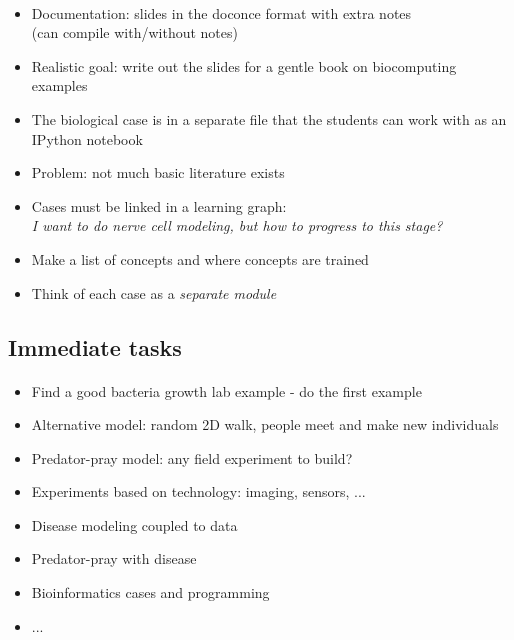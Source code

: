 \documentclass[%
twoside,                 %
final,                   %
10pt]{article}
\begin{document}
\paragraph{}
\begin{itemize}
 \item Documentation: slides in the doconce format with extra notes\\
   (can compile with/without notes)

 \item Realistic goal: write out the slides for a gentle book on biocomputing examples

 \item The biological case is in a separate file that the students can work
   with as an IPython notebook

 \item Problem: not much basic literature exists

 \item Cases must be linked in a learning graph:\\
   \emph{I want to do nerve cell modeling, but how to progress to this stage?}

 \item Make a list of concepts and where concepts are trained

 \item Think of each case as a \emph{separate module}
\end{itemize}

\noindent



\subsection{Immediate tasks}


\paragraph{}
\begin{itemize}
 \item Find a good bacteria growth lab example - do the first example

 \item Alternative model: random 2D walk, people meet and make new individuals

 \item Predator-pray model: any field experiment to build?

 \item Experiments based on technology: imaging, sensors, ...

 \item Disease modeling coupled to data

 \item Predator-pray with disease

 \item Bioinformatics cases and programming

 \item ...
\end{itemize}
\end{document}
